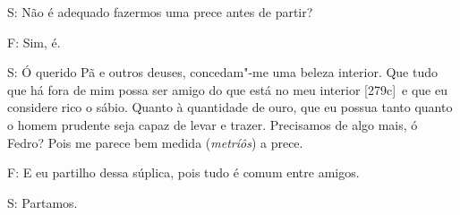  

S: Não é adequado fazermos uma prece antes de partir?

 

F: Sim, é.

 

S: Ó querido Pã e outros deuses, concedam"-me uma beleza interior. Que
tudo que há fora de mim possa ser amigo do que está no meu interior
[279c]~e que eu considere rico o sábio. Quanto à quantidade de ouro,
que eu possua tanto quanto o homem prudente seja capaz de levar e
trazer. Precisamos de algo mais, ó Fedro? Pois me parece bem medida
(\emph{metríôs}) a prece.

 

F: E eu partilho dessa súplica, pois tudo é comum entre amigos.

 

S: Partamos.


